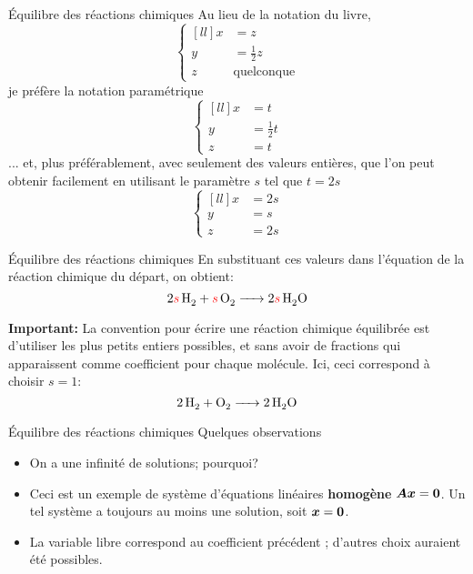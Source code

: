 \documentclass[french]{beamer}
\begin{document}
\begin{frame}{Équilibre des réactions chimiques}
Au lieu de la notation du livre, 
\[
\left\{
\begin{matrix}[ll]
x & = z\\
y & = \frac12 z \\
z & \mbox{quelconque}
\end{matrix}
\right.
\]
je préfère la notation paramétrique
\[
\left\{
\begin{matrix}[ll]
x & = t\\
y & = \frac12 t \\
z & = t
\end{matrix}
\right.
\]
... et, plus préférablement, avec seulement des
valeurs entières, que l'on peut obtenir facilement
en utilisant le paramètre $s$ tel que $t = 2s$
\[
\left\{
\begin{matrix}[ll]
x & = 2s\\
y & = s \\
z & = 2s
\end{matrix}
\right.
\]
\end{frame}

\begin{frame}{Équilibre des réactions chimiques}
En substituant ces valeurs dans l'équation de la
réaction chimique du départ, on obtient:
\[
\ce{$2{\color{red}s}\,$H2 + ${\color{red}s}\,$O2 -> $2{\color{red}s}\,$H2O }
\]
\vfill

\textbf{Important:} La convention pour écrire une réaction chimique équilibrée est d'utiliser les 
plus petits entiers possibles, et sans avoir de
fractions qui apparaissent comme coefficient pour
chaque molécule.   Ici, ceci correspond à choisir
$s=1$:
\[
\ce{$2\,$H2 + O2 -> $2\,$H2O }
\]
\end{frame}

\begin{frame}{Équilibre des réactions chimiques}
Quelques observations
\begin{itemize}
\item On a une infinité de solutions; pourquoi?
\item Ceci est un exemple de système d'équations linéaires \textbf{homogène} $\boldsymbol{A}\boldsymbol{x} = \boldsymbol{0}$.
Un tel système a toujours au moins une solution, soit
$\boldsymbol{x} = \boldsymbol{0}$.
\item La variable libre correspond au coefficient précédent ; d'autres choix auraient été possibles.
\end{itemize}
\end{frame}
\end{document}
